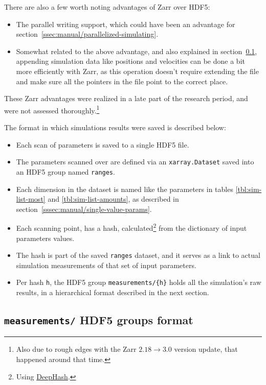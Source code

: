 There are also a few worth noting advantages of Zarr over HDF5:

\begin{itemize}
	\item The parallel writing support, which could have been an advantage for section~\ref{ssec:manual/parallelized-simulating}.
	\item Somewhat related to the above advantage, and also explained in section~\ref{ssec:HDF5-measurements-format}, appending simulation data like positions and velocities can be done a bit more efficiently with Zarr, as this operation doesn't require extending the file and make sure all the pointers in the file point to the correct place.
\end{itemize}

These Zarr advantages were realized in a late part of the research period, and were not assessed thoroughly.\footnote{Also due to rough edges with the Zarr $2.18 \rightarrow 3.0$ version update, that happened around that time.}

The format in which simulations results were saved is described below:

\begin{itemize}
	\item Each scan of parameters is saved to a single HDF5 file.
	\item The parameters scanned over are defined via an \texttt{xarray.Dataset} saved into an HDF5 group named \texttt{ranges}.
	\item Each dimension in the dataset is named like the parameters in tables \ref{tbl:sim-list-most} and \ref{tbl:sim-list-amounts}, as described in section~\ref{sssec:manual/single-value-params}.
	\item Each scanning point, has a hash, calculated\footnote{Using \href{https://zepworks.com/deepdiff/current/deephash.html}{DeepHash}.} from the dictionary of input parameters values.
	\item The hash is part of the saved \texttt{ranges} dataset, and it serves as a link to actual simulation measurements of that set of input parameters.
	\item Per hash \texttt{h}, the HDF5 group \texttt{measurements/\{h\}} holds all the simulation's raw results, in a hierarchical format described in the next section.
\end{itemize}

\subsection{\texttt{measurements/} HDF5 groups format}\label{ssec:HDF5-measurements-format}

